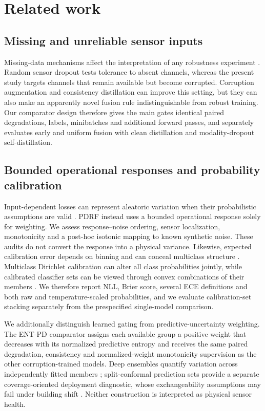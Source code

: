 \documentclass[11pt]{article}
\begin{document}
\section{Related work}

\subsection{Missing and unreliable sensor inputs}

Missing-data mechanisms affect the interpretation of any robustness experiment \citep{little2019missing}. Random sensor dropout tests tolerance to absent channels, whereas the present study targets channels that remain available but become corrupted. Corruption augmentation and consistency distillation can improve this setting, but they can also make an apparently novel fusion rule indistinguishable from robust training. Our comparator design therefore gives the main gates identical paired degradations, labels, minibatches and additional forward passes, and separately evaluates early and uniform fusion with clean distillation and modality-dropout self-distillation.

\subsection{Bounded operational responses and probability calibration}

Input-dependent losses can represent aleatoric variation when their probabilistic assumptions are valid \citep{kendall2017uncertainties,hullermeier2021uncertainty}. PDRF instead uses a bounded operational response solely for weighting. We assess response--noise ordering, sensor localization, monotonicity and a post-hoc isotonic mapping to known synthetic noise. These audits do not convert the response into a physical variance. Likewise, expected calibration error depends on binning and can conceal multiclass structure \citep{vaicenavicius2019calibration}. Multiclass Dirichlet calibration can alter all class probabilities jointly, while calibrated classifier sets can be viewed through convex combinations of their members \citep{kull2019dirichlet,mortier2023classifier}. We therefore report NLL, Brier score, several ECE definitions and both raw and temperature-scaled probabilities, and we evaluate calibration-set stacking separately from the prespecified single-model comparison.

We additionally distinguish learned gating from predictive-uncertainty weighting. The ENT-PD comparator assigns each available group a positive weight that decreases with its normalized predictive entropy and receives the same paired degradation, consistency and normalized-weight monotonicity supervision as the other corruption-trained models. Deep ensembles quantify variation across independently fitted members \citep{lakshminarayanan2017ensembles}; split-conformal prediction sets provide a separate coverage-oriented deployment diagnostic, whose exchangeability assumptions may fail under building shift \citep{podkopaev2021distribution}. Neither construction is interpreted as physical sensor health.
\end{document}
